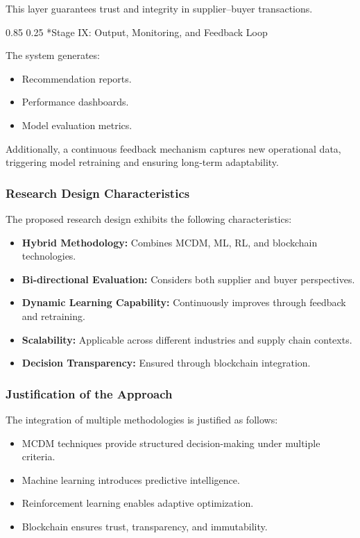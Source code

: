 \documentclass[11pt]{article}
\makeatletter
\renewcommand\paragraph{\@startsection{paragraph}{4}{\z@}%
  {0.85\baselineskip}%
  {0.25\baselineskip}%
  {\normalfont\normalsize\bfseries}}
\makeatother
\begin{document}
This layer guarantees trust and integrity in supplier--buyer transactions.

\paragraph*{Stage IX: Output, Monitoring, and Feedback Loop}

The system generates:

\begin{itemize}
\item Recommendation reports.
\item Performance dashboards.
\item Model evaluation metrics.
\end{itemize}

Additionally, a continuous feedback mechanism captures new operational data, triggering model retraining and ensuring long-term adaptability.

\subsubsection{Research Design Characteristics}

The proposed research design exhibits the following characteristics:

\begin{itemize}
\item \textbf{Hybrid Methodology:} Combines MCDM, ML, RL, and blockchain technologies.
\item \textbf{Bi-directional Evaluation:} Considers both supplier and buyer perspectives.
\item \textbf{Dynamic Learning Capability:} Continuously improves through feedback and retraining.
\item \textbf{Scalability:} Applicable across different industries and supply chain contexts.
\item \textbf{Decision Transparency:} Ensured through blockchain integration.
\end{itemize}

\subsubsection{Justification of the Approach}

The integration of multiple methodologies is justified as follows:

\begin{itemize}
\item MCDM techniques provide structured decision-making under multiple criteria.
\item Machine learning introduces predictive intelligence.
\item Reinforcement learning enables adaptive optimization.
\item Blockchain ensures trust, transparency, and immutability.
\end{itemize}
\end{document}
